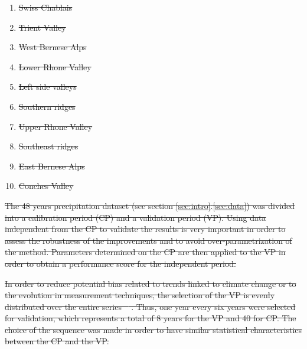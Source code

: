\documentclass[review]{elsarticle}
\providecommand{\DIFdeltex}[1]{{\protect\color{red}\sout{#1}}}                      %
\providecommand{\DIFdel}[1]{\texorpdfstring{\DIFdeltex{#1}}{}} %
\begin{document}
\begin{enumerate}%
\item%
\DIFdel{Swiss Chablais
	}%
\item%
\DIFdel{Trient Valley
	}%
\item%
\DIFdel{West Bernese Alps
	}%
\item%
\DIFdel{Lower Rhone Valley
	}%
\item%
\DIFdel{Left side valleys
	}%
\item%
\DIFdel{Southern ridges
	}%
\item%
\DIFdel{Upper Rhone Valley
	}%
\item%
\DIFdel{Southeast ridges
	}%
\item%
\DIFdel{East Bernese Alps
	}%
\item%
\DIFdel{Conches Valley
}
\end{enumerate}%

\DIFdel{The 48 years precipitation dataset (see section \ref{sec:intro}.\ref{sec:data}) was divided into a calibration period (CP) and a validation period (VP). Using data independent from the CP to validate the results is very important in order to assess the robustness of the improvements and to avoid over-parametrization of the method. Parameters determined on the CP are then applied to the VP in order to obtain a performance score for the independent period.
}%

\DIFdel{In order to reduce potential bias related to trends linked to climate change or to the evolution in measurement techniques, the selection of the VP is evenly distributed over the entire series \mbox{%
\citep{BenDaoud2010}}%
. Thus, one year every six years were selected for validation, which represents a total of 8 years for the VP and 40 for CP. The choice of the sequence was made in order to have similar statistical characteristics between the CP and the VP.
}%
\end{document}
